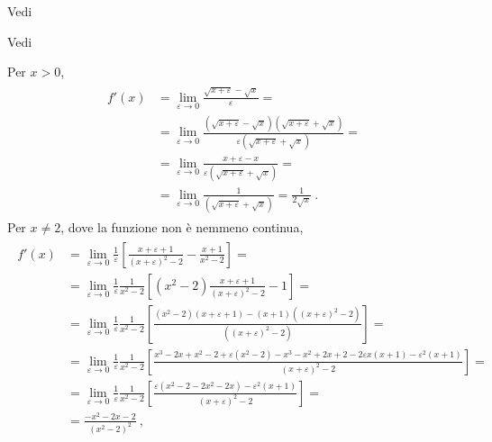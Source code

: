 \documentclass[letterpaper,10pt,italian]{jupyterBook}
\begin{document}
\sphinxAtStartPar
{} Vedi {\hyperref[\detokenize{ch/infinitesimal_calculus/derivatives-notes:infinitesimal-calculus-derivatives-fund-notes}]{}}

\sphinxAtStartPar
{} Vedi {\hyperref[\detokenize{ch/infinitesimal_calculus/derivatives-notes:infinitesimal-calculus-derivatives-fund-notes}]{}}

\sphinxAtStartPar
{} Per \(x > 0\),
\begin{equation*}
\begin{split}\begin{aligned}
 f'(x)
 & = \lim_{\varepsilon \to 0} \frac{\sqrt{x+\varepsilon} - \sqrt{x}}{\varepsilon} = \\
 & = \lim_{\varepsilon \to 0} \frac{\left(\sqrt{x+\varepsilon} - \sqrt{x}\right)\left(\sqrt{x+\varepsilon} + \sqrt{x}\right)}{\varepsilon\left(\sqrt{x+\varepsilon} + \sqrt{x}\right)} = \\
 & = \lim_{\varepsilon \to 0} \frac{x+\varepsilon - x}{\varepsilon\left(\sqrt{x+\varepsilon} + \sqrt{x}\right)} = \\
 & = \lim_{\varepsilon \to 0} \frac{1}{\left(\sqrt{x+\varepsilon} + \sqrt{x}\right)} = \frac{1}{2 \sqrt{x}} \ .
\end{aligned}\end{split}
\end{equation*}
\sphinxAtStartPar
{} Per \(x \ne 2\), dove la funzione non è nemmeno continua,
\begin{equation*}
\begin{split}\begin{aligned}
  f'(x)
  & = \lim_{\varepsilon \to 0} \frac{1}{\varepsilon} \left[ \frac{x+\varepsilon+1}{(x+\varepsilon)^2-2} - \frac{x+1}{x^2-2} \right] = \\
  & = \lim_{\varepsilon \to 0} \frac{1}{\varepsilon} \frac{1}{x^2-2} \left[ (x^2-2) \frac{x+\varepsilon+1}{(x+\varepsilon)^2-2} - 1 \right] = \\
  & = \lim_{\varepsilon \to 0} \frac{1}{\varepsilon} \frac{1}{x^2-2} \left[ \frac{(x^2-2)(x+\varepsilon+1) - (x+1)( (x+\varepsilon)^2-2)}{( (x+\varepsilon)^2-2)} \right] = \\
  & = \lim_{\varepsilon \to 0} \frac{1}{\varepsilon} \frac{1}{x^2-2} \left[ \frac{x^3-2 x + x^2 -2 + \varepsilon(x^2-2) - x^3 - x^2 + 2 x + 2 - 2 \varepsilon x ( x+1) - \varepsilon^2 (x+1) }{ (x+\varepsilon)^2-2} \right] = \\
  & = \lim_{\varepsilon \to 0} \frac{1}{\varepsilon} \frac{1}{x^2-2} \left[ \frac{\varepsilon (x^2-2 - 2x^2-2x) - \varepsilon^2 (x+1) }{ (x+\varepsilon)^2-2} \right] = \\
  & = \frac{-x^2-2x-2}{(x^2-2)^2} \ ,
\end{aligned}\end{split}
\end{equation*}
\end{document}
